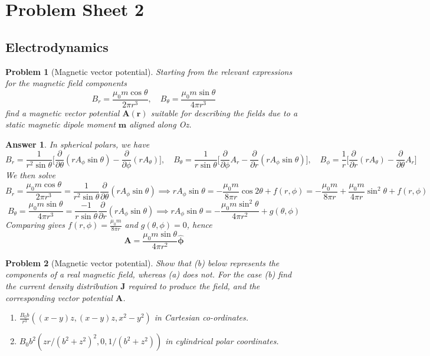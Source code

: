 \documentclass[a4paper]{article}
\newtheorem{ans}{Answer}[section]
\theoremstyle{new}
\newtheorem{qns}{Problem}[section]
\begin{document}
\section{Problem Sheet 2}
\subsection*{Electrodynamics}
\begin{qns}[Magnetic vector potential]
Starting from the relevant expressions for the magnetic field components
$$B_r=\frac{\mu_0m\cos\theta}{2\pi r^3},\quad B_\theta=\frac{\mu_0m\sin\theta}{4\pi r^3}$$
find a magnetic vector potential $\mathbf{A}(\mathbf{r})$ suitable for describing the fields due to a static magnetic dipole moment $\mathbf{m}$ aligned along Oz.
\end{qns}
\begin{ans}
In spherical polars, we have
$$B_r=\frac{1}{r^2\sin\theta}\bigg[\frac{\partial}{\partial\theta}(rA_\phi\sin\theta)-\frac{\partial}{\partial\phi}(rA_\theta)\bigg],\quad B_\theta=\frac{1}{r\sin\theta}\bigg[\frac{\partial}{\partial\phi}A_r-\frac{\partial}{\partial r}(rA_\phi\sin\theta)\bigg],\quad B_\phi=\frac{1}{r}\bigg[\frac{\partial}{\partial r}(rA_\theta)-\frac{\partial}{\partial\theta} A_r\bigg]$$
We then solve
$$B_r=\frac{\mu_0m\cos\theta}{2\pi r^3}=\frac{1}{r^2\sin\theta}\frac{\partial}{\partial\theta}(rA_\phi\sin\theta)\implies rA_\phi\sin\theta=-\frac{\mu_0m}{8\pi r}\cos2\theta+f(r,\phi)=-\frac{\mu_0m}{8\pi r}+\frac{\mu_0m}{4\pi r}\sin^2\theta+f(r,\phi)$$
$$B_\theta=\frac{\mu_0m\sin\theta}{4\pi r^3}=\frac{-1}{r\sin\theta}\frac{\partial}{\partial r}(rA_\phi\sin\theta)\implies rA_\phi\sin\theta=-\frac{\mu_0m\sin^2\theta}{4\pi r^2}+g(\theta,\phi)$$
Comparing gives $f(r,\phi)=\frac{\mu_0m}{8\pi r}$ and $g(\theta,\phi)=0$, hence
$$\mathbf{A}=\frac{\mu_0m\sin\theta}{4\pi r^2}\boldsymbol{\hat{\phi}}$$
\end{ans}
\begin{qns}[Magnetic vector potential]
Show that (b) below represents the components of a real magnetic field, whereas (a) does not. For the case (b) find the current density distribution $\mathbf{J}$ required to produce the field, and the corresponding vector potential $\mathbf{A}$.
\begin{enumerate}[label=(\alph*)]
\item $\frac{B_0b}{r^3}((x-y)z,(x-y)z,x^2-y^2)$ in Cartesian co-ordinates.
\item $B_0b^2(zr/(b^2+z^2)^2,0,1/(b^2+z^2))$ in cylindrical polar coordinates.
\end{enumerate}
\end{qns}
\end{document}
